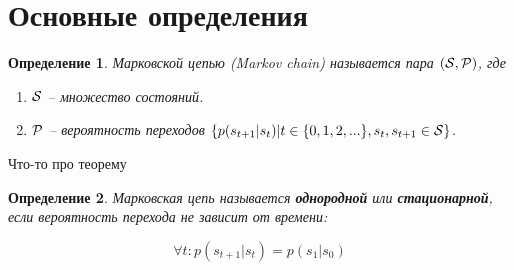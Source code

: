 \documentclass[12pt,draft]{article}
\begin{document}
\section*{Основные определения}

\newtheorem{definition}{Определение}
\begin{definition}
    Марковской цепью (Markov chain) называется пара 
    $(\mathbf{\cal S}, \mathbf{\cal P})$, где

    \begin{enumerate}
        \item $\mathbf{\cal S}$ -- множество состояний.
        \item $\mathbf{\cal P}$ -- вероятность переходов $\{p(s_{t+1}|s_{t}) 
        | t \in \{0, 1, 2, ...\}, s_{t}, s_{t+1} \in \mathbf{\cal S}\}$.
     \end{enumerate}


\end{definition}

Что-то про теорему
\begin{definition}
    
    Марковская цепь называется {\bf однородной}
    или {\bf стационарной}, если вероятность перехода не зависит от времени:

    $$\forall t: p(s_{t+1} | s_{t}) = p(s_{1} | s_{0})$$


\end{definition}
\end{document}

